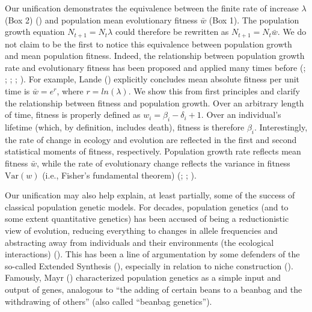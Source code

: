\documentclass[
]{article}
\begin{document}
Our unification demonstrates the equivalence between the finite rate of
increase \(\lambda\) (Box 2) ()
and population mean evolutionary fitness \(\bar{w}\) (Box 1). The
population growth equation \(N_{t+1} = N_{t}\lambda\) could therefore be
rewritten as \(N_{t+1} = N_{t}\bar{w}\). We do not claim to be the first
to notice this equivalence between population growth and mean population
fitness. Indeed, the relationship between population growth rate and
evolutionary fitness has been proposed and applied many times before
(;
;
; ; ). For example, Lande
() explicitly concludes mean absolute
fitness per unit time is \(\bar{w} = e^{r}\), where \(r = ln(\lambda)\).
We show this from first principles and clarify the relationship between
fitness and population growth. Over an arbitrary length of time, fitness
is properly defined as \(w_{i} = \beta_{i} - \delta_{i} + 1\). Over an
individual's lifetime (which, by definition, includes death), fitness is
therefore \(\beta_{i}\). Interestingly, the rate of change in ecology
and evolution are reflected in the first and second statistical moments
of fitness, respectively. Population growth rate reflects mean fitness
\(\bar{w}\), while the rate of evolutionary change reflects the variance
in fitness \(\mathrm{Var}(w)\) (i.e., Fisher's fundamental theorem)
(; ; ).

Our unification may also help explain, at least partially, some of the
success of classical population genetic models. For decades, population
genetics (and to some extent quantitative genetics) has been accused of
being a reductionistic view of evolution, reducing everything to changes
in allele frequencies and abstracting away from individuals and their
environments (the ecological interactions)
(). This has been a line of
argumentation by some defenders of the so-called Extended Synthesis
(), especially in relation
to niche construction (). Famously, Mayr () characterized
population genetics as a simple input and output of genes, analogous to
``the adding of certain beans to a beanbag and the withdrawing of
others'' (also called ``beanbag genetics'').
\end{document}
